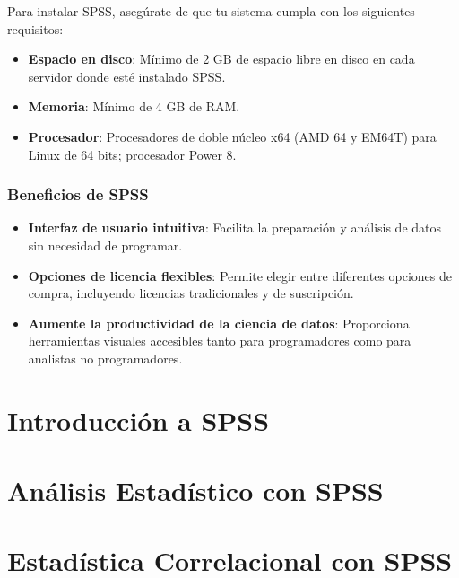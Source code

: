 \documentclass[
  letterpaper,
  DIV=11,
  numbers=noendperiod]{scrreprt}
\begin{document}
Para instalar SPSS, asegúrate de que tu sistema cumpla con los
siguientes requisitos:

\begin{itemize}
\item
  \textbf{Espacio en disco}: Mínimo de 2 GB de espacio libre en disco en
  cada servidor donde esté instalado SPSS.
\item
  \textbf{Memoria}: Mínimo de 4 GB de RAM.
\item
  \textbf{Procesador}: Procesadores de doble núcleo x64 (AMD 64 y EM64T)
  para Linux de 64 bits; procesador Power 8.
\end{itemize}

\subsection*{Beneficios de SPSS}\label{beneficios-de-spss}

\begin{itemize}
\item
  \textbf{Interfaz de usuario intuitiva}: Facilita la preparación y
  análisis de datos sin necesidad de programar.
\item
  \textbf{Opciones de licencia flexibles}: Permite elegir entre
  diferentes opciones de compra, incluyendo licencias tradicionales y de
  suscripción.
\item
  \textbf{Aumente la productividad de la ciencia de datos}: Proporciona
  herramientas visuales accesibles tanto para programadores como para
  analistas no programadores.
\end{itemize}


\chapter{Introducción a SPSS}\label{introducciuxf3n-a-spss}


\chapter{Análisis Estadístico con
SPSS}\label{anuxe1lisis-estaduxedstico-con-spss}


\chapter{Estadística Correlacional con
SPSS}\label{estaduxedstica-correlacional-con-spss}
\end{document}
